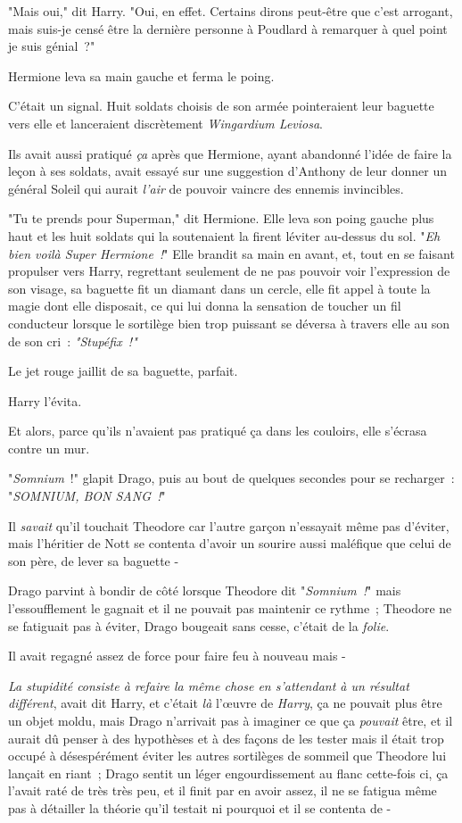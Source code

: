 "Mais oui," dit Harry. "Oui, en effet. Certains dirons peut-être que c'est arrogant, mais suis-je censé être la dernière personne à Poudlard à remarquer à quel point je suis génial~?"

Hermione leva sa main gauche et ferma le poing.

C'était un signal. Huit soldats choisis de son armée pointeraient leur baguette vers elle et lanceraient discrètement \emph{Wingardium Leviosa}.

Ils avait aussi pratiqué \emph{ça} après que Hermione, ayant abandonné l'idée de faire la leçon à ses soldats, avait essayé sur une suggestion d'Anthony de leur donner un général Soleil qui aurait \emph{l'air} de pouvoir vaincre des ennemis invincibles.

"Tu te prends pour Superman," dit Hermione. Elle leva son poing gauche plus haut et les huit soldats qui la soutenaient la firent léviter au-dessus du sol. "\emph{Eh bien voilà Super Hermione~!}" Elle brandit sa main en avant, et, tout en se faisant propulser vers Harry, regrettant seulement de ne pas pouvoir voir l'expression de son visage, sa baguette fit un diamant dans un cercle, elle fit appel à toute la magie dont elle disposait, ce qui lui donna la sensation de toucher un fil conducteur lorsque le sortilège bien trop puissant se déversa à travers elle au son de son cri~: \emph{"Stupéfix~!"}

Le jet rouge jaillit de sa baguette, parfait.

Harry l'évita.

Et alors, parce qu'ils n'avaient pas pratiqué ça dans les couloirs, elle s'écrasa contre un mur.

\later

"\emph{Somnium}~!" glapit Drago, puis au bout de quelques secondes pour se recharger~: "\emph{SOMNIUM, BON SANG~!}"

Il \emph{savait} qu'il touchait Theodore car l'autre garçon n'essayait même pas d'éviter, mais l'héritier de Nott se contenta d'avoir un sourire aussi maléfique que celui de son père, de lever sa baguette -

Drago parvint à bondir de côté lorsque Theodore dit "\emph{Somnium~!}" mais l'essoufflement le gagnait et il ne pouvait pas maintenir ce rythme~; Theodore ne se fatiguait pas à éviter, Drago bougeait sans cesse, c'était de la \emph{folie}.

Il avait regagné assez de force pour faire feu à nouveau mais -

\emph{La stupidité consiste à refaire la même chose en s'attendant à un résultat différent}, avait dit Harry, et c'était \emph{là} l'œuvre de \emph{Harry}, ça ne pouvait plus être un objet moldu, mais Drago n'arrivait pas à imaginer ce que ça \emph{pouvait} être, et il aurait dû penser à des hypothèses et à des façons de les tester mais il était trop occupé à désespérément éviter les autres sortilèges de sommeil que Theodore lui lançait en riant~; Drago sentit un léger engourdissement au flanc cette-fois ci, ça l'avait raté de très très peu, et il finit par en avoir assez, il ne se fatigua même pas à détailler la théorie qu'il testait ni pourquoi et il se contenta de -

